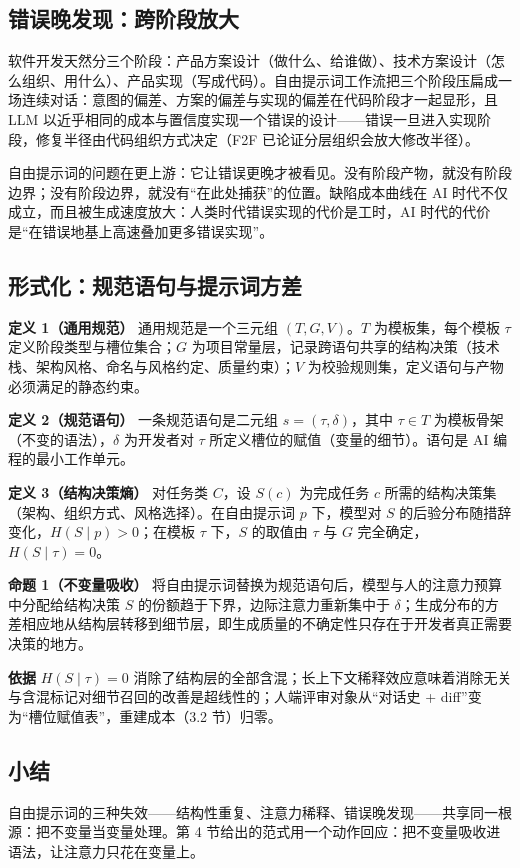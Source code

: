 \documentclass[11pt,a4paper]{ctexart}
\begin{document}
\subsection{错误晚发现：跨阶段放大}
软件开发天然分三个阶段：产品方案设计（做什么、给谁做）、技术方案设计（怎么组织、用什么）、产品实现（写成代码）。自由提示词工作流把三个阶段压扁成一场连续对话：意图的偏差、方案的偏差与实现的偏差在代码阶段才一起显形，且 LLM 以近乎相同的成本与置信度实现一个错误的设计\cite{ref14,ref15}——错误一旦进入实现阶段，修复半径由代码组织方式决定（F2F\cite{ref20} 已论证分层组织会放大修改半径）。

自由提示词的问题在更上游：它让错误更晚才被看见。没有阶段产物，就没有阶段边界；没有阶段边界，就没有“在此处捕获”的位置。缺陷成本曲线\cite{ref7}在 AI 时代不仅成立，而且被生成速度放大：人类时代错误实现的代价是工时，AI 时代的代价是“在错误地基上高速叠加更多错误实现”。

\subsection{形式化：规范语句与提示词方差}
\textbf{定义 1（通用规范）} 通用规范是一个三元组 $(T,G,V)$。$T$ 为模板集，每个模板 $\tau$ 定义阶段类型与槽位集合；$G$ 为项目常量层，记录跨语句共享的结构决策（技术栈、架构风格、命名与风格约定、质量约束）；$V$ 为校验规则集，定义语句与产物必须满足的静态约束。

\textbf{定义 2（规范语句）} 一条规范语句是二元组 $s=(\tau,\delta)$，其中 $\tau\in T$ 为模板骨架（不变的语法），$\delta$ 为开发者对 $\tau$ 所定义槽位的赋值（变量的细节）。语句是 AI 编程的最小工作单元。

\textbf{定义 3（结构决策熵）} 对任务类 $C$，设 $S(c)$ 为完成任务 $c$ 所需的结构决策集（架构、组织方式、风格选择）。在自由提示词 $p$ 下，模型对 $S$ 的后验分布随措辞变化，$H(S\mid p)>0$；在模板 $\tau$ 下，$S$ 的取值由 $\tau$ 与 $G$ 完全确定，$H(S\mid \tau)=0$。

\textbf{命题 1（不变量吸收）} 将自由提示词替换为规范语句后，模型与人的注意力预算中分配给结构决策 $S$ 的份额趋于下界，边际注意力重新集中于 $\delta$；生成分布的方差相应地从结构层转移到细节层，即生成质量的不确定性只存在于开发者真正需要决策的地方。

\textbf{依据} $H(S\mid\tau)=0$ 消除了结构层的全部含混；长上下文稀释效应\cite{ref11}意味着消除无关与含混标记对细节召回的改善是超线性的；人端评审对象从“对话史 + diff”变为“槽位赋值表”，重建成本（3.2 节）归零。

\subsection{小结}
自由提示词的三种失效——结构性重复、注意力稀释、错误晚发现——共享同一根源：把不变量当变量处理。第 4 节给出的范式用一个动作回应：把不变量吸收进语法，让注意力只花在变量上。
\end{document}
